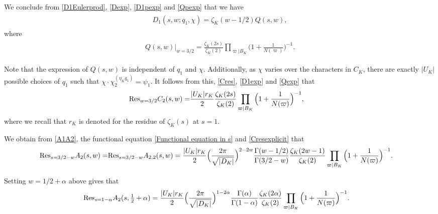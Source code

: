 \documentclass[twoside,leqno,10pt, A4]{amsart}
\begin{document}
 We conclude from \eqref{D1Eulerprod}, \eqref{Dexp}, \eqref{D1pexp} and \eqref{Qpexp} that we have
\begin{align}
\label{D1exp}	
\begin{split}
   D_{1}(s, w; q_1,  \chi) =\zeta_K(w-1/2)Q(s,w),
\end{split}
\end{align}
	where
\begin{align}
\label{Qexp}	
\begin{split}
   Q(s,w)\Big |_{w=3/2}=\frac {\zeta_K(2s)}{\zeta_K(2)}\prod_{\varpi | B_K}\Big(1+\frac 1{N(\varpi)}\Big )^{-1}.
\end{split}
\end{align}

   Note that the expression of $Q(s, w)$ is independent of $q_1$ and $\chi$.  Additionally, as $\chi$ varies over the characters in $C_K$, there are exactly $|U_K|$ possible choices of $q_1$ such that $\chi \cdot \chi^{(\eta_Kq_1)}_2=\psi_1$. It follows from this, \eqref{Cres}, \eqref{D1exp} and \eqref{Qexp} that
\begin{align}
\label{Cresexplicit}
		\mathrm{Res}_{w=3/2}C_2(s,w)=& \frac {|U_K|r_K}{2}\frac {\zeta_K(2s)}{\zeta_K(2)}\prod_{\varpi | B_K}\Big(1+\frac 1{N(\varpi)}\Big )^{-1},
\end{align}
  where we recall that $r_K$ is denoted for the residue of $\zeta_K(s)$ at $s=1$. \newline
	
 We obtain from \eqref{A1A2}, the functional equation \eqref{Functional equation in s} and \eqref{Cresexplicit} that
\begin{align*}
  \mathrm{Res}_{s=3/2-w}A_2(s,w) =& \mathrm{Res}_{s=3/2-w}A_{2,2}(s,w) =\frac {|U_K|r_K}{2} \Big(\frac {2\pi}{\sqrt{|D_K|}}\Big )^{2-2w}\frac {\Gamma(w-1/2)}{\Gamma(3/2-w)} \frac
{\zeta_K(2w-1)}{\zeta_K(2)}\prod_{\varpi | B_K}\Big(1+\frac 1{N(\varpi)}\Big )^{-1} .
\end{align*}

Setting $w=1/2+\alpha$ above gives that
\begin{align}
\label{Aress1alpha}
\begin{split}
			&\mathrm{Res}_{s=1-\alpha}A_2(s, \tfrac{1}{2}+\alpha) =\frac {|U_K|r_K}{2} \Big(\frac {2\pi}{\sqrt{|D_K|}}\Big )^{1-2\alpha}\frac
{\Gamma(\alpha)}{\Gamma(1-\alpha)} \frac {\zeta_K(2\alpha)}{\zeta_K(2)}\prod_{\varpi | B_K}\Big(1+\frac 1{N(\varpi)}\Big )^{-1} .
\end{split}
\end{align}
	
\end{document}
